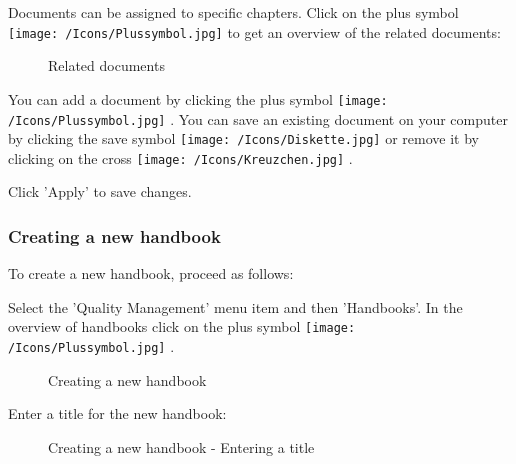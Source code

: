 Documents can be assigned to specific chapters. Click on the plus symbol \texttt{[image: /Icons/Plussymbol.jpg]}  to get an overview of the related documents:

\begin{figure}[H]
\caption{Related documents}
\end{figure}

You can add a document by clicking the plus symbol \texttt{[image: /Icons/Plussymbol.jpg]} . You can save an existing document on your computer by clicking the save symbol \texttt{[image: /Icons/Diskette.jpg]}  or remove it by clicking on the cross \texttt{[image: /Icons/Kreuzchen.jpg]} .

Click 'Apply'  to save changes. 

\subsubsection{Creating a new handbook}
\label{bkm:Ref930000788}

To create a new handbook, proceed as follows:

Select the 'Quality Management' menu item and then 'Handbooks'. In the overview of handbooks click on the plus symbol \texttt{[image: /Icons/Plussymbol.jpg]} .

\begin{figure}[H]
\caption{Creating a new handbook}
\end{figure}

Enter a title for the new handbook: 

\begin{figure}[H]
\caption{Creating a new handbook - Entering a title}
\end{figure}

